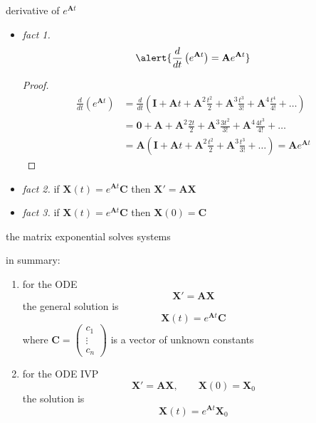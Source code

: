 \documentclass[dvipsnames,colorlinks]{beamer}
\newcommand{\ds}{\displaystyle}
\newcommand{\bA}{\mathbf{A}}
\newcommand{\bC}{\mathbf{C}}
\newcommand{\bI}{\mathbf{I}}
\newcommand{\bX}{\mathbf{X}}
\begin{document}
\begin{frame}{derivative of $e^{\bA t}$}

\begin{itemize}
\item \emph{fact 1.}
    $$\alert{\frac{d}{dt}\left(e^{\bA t}\right) = \bA e^{\bA t}}$$
\small
\begin{proof}

\vspace{-5mm}
\footnotesize
\begin{align*}
\frac{d}{dt}\left(e^{\bA t}\right) &= \frac{d}{dt}\left(\bI + \bA t + \bA^2 \frac{t^2}{2} + \bA^3 \frac{t^3}{3!} + \bA^4 \frac{t^4}{4!} + \dots\right) \\
    &= \mathbf{0} + \bA + \bA^2 \frac{2t}{2} + \bA^3 \frac{3 t^2}{3!} + \bA^4 \frac{4 t^3}{4!} + \dots \\
    &= \bA \left(\bI + \bA t + \bA^2 \frac{t^2}{2} + \bA^3 \frac{t^3}{3!} + \dots\right) = \bA e^{\bA t}
\end{align*}
\end{proof}
\normalsize

\medskip
\item \emph{fact 2.}  if $\bX(t) = e^{\bA t}\bC$ then $\bX'=\bA \bX$

\medskip
\item \emph{fact 3.}  if $\bX(t) = e^{\bA t}\bC$ then $\bX(0) = \bC$
\end{itemize}
\end{frame}


\begin{frame}{the matrix exponential solves systems}

\noindent in summary:
\begin{enumerate}
\item for the ODE
    $$\bX' = \bA \bX$$
the general solution is
    $$\bX(t) = e^{\bA t} \bC$$
where $\ds \bC=\begin{pmatrix}c_1 \\ \vdots \\ c_n\end{pmatrix}$ is a vector of unknown constants
\item for the ODE IVP
    $$\bX' = \bA \bX, \qquad \bX(0)=\bX_0$$
the solution is
    $$\bX(t) = e^{\bA t} \bX_0$$
\end{enumerate}
\end{frame}
\end{document}
